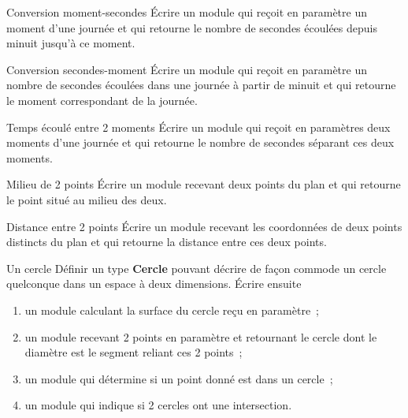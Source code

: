 		\begin{Exercice}{Conversion moment-secondes}
			Écrire un module qui reçoit en paramètre un
			moment d’une journée et qui retourne le nombre de secondes écoulées
			depuis minuit jusqu’à ce moment.
		\end{Exercice}
		
		\begin{Exercice}{Conversion secondes-moment}
			Écrire un module qui reçoit en paramètre un
			nombre de secondes écoulées dans une journée à partir de minuit et qui
			retourne le moment correspondant de la journée.
		\end{Exercice}
		
		\begin{Exercice}{Temps écoulé entre 2 moments}
			Écrire un module qui reçoit en paramètres deux
			moments d’une journée et qui retourne le nombre de secondes séparant
			ces deux moments.
		\end{Exercice}
		
		\begin{Exercice}{Milieu de 2 points}
			Écrire un module recevant deux points du plan 
			et qui retourne le point situé au milieu des deux.
		\end{Exercice}
		
		\begin{Exercice}{Distance entre 2 points}
			Écrire un module recevant les coordonnées de
			deux points distincts du plan et qui retourne
			la distance entre ces deux points.
		\end{Exercice}
		
		\begin{Exercice}{Un cercle}
			Définir un type \textbf{Cercle} pouvant décrire de façon
			commode un cercle quelconque dans un espace à deux dimensions. 	
			Écrire ensuite
			
			\begin{enumerate}[label=\alph*)]
			\item {
				un module calculant la surface du cercle reçu en paramètre~;}
			\item {
				un module recevant 2 points en paramètre et retournant le cercle dont le
				diamètre est le segment reliant ces 2 points~;}
			\item {
				un module qui détermine si un point donné est dans un cercle~;}
			\item {
				un module qui indique si 2 cercles ont une intersection.
			}
			\end{enumerate}
		\end{Exercice}
		
